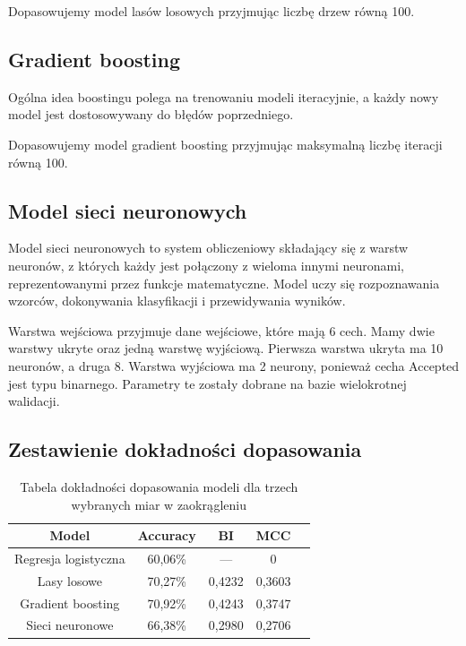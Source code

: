 \documentclass[12pt]{article}
\begin{document}
	\vspace{0.25cm}
	
	Dopasowujemy model lasów losowych przyjmując liczbę drzew równą 100.
	
	\subsection{Gradient boosting}\label{subsec:gradient-boosting}
	Ogólna idea boostingu polega na trenowaniu modeli iteracyjnie, a każdy nowy model jest dostosowywany do błędów poprzedniego.
	
	\vspace{0.25cm}
	
	Dopasowujemy model gradient boosting przyjmując maksymalną liczbę iteracji równą 100.
	
	\subsection{Model sieci neuronowych}\label{subsec:model-sieci-neuronowych}
	Model sieci neuronowych to system obliczeniowy składający się z warstw neuronów, z których każdy jest połączony z wieloma innymi neuronami, reprezentowanymi przez funkcje matematyczne. Model uczy się rozpoznawania wzorców, dokonywania klasyfikacji i przewidywania wyników.
	
	\vspace{0.25cm}
	
	Warstwa wejściowa przyjmuje dane wejściowe, które mają 6 cech. Mamy dwie warstwy ukryte oraz jedną warstwę wyjściową. Pierwsza warstwa ukryta ma 10 neuronów, a druga 8. Warstwa wyjściowa ma 2 neurony, ponieważ cecha Accepted jest typu binarnego. Parametry te zostały dobrane na bazie wielokrotnej walidacji.
	
	\subsection{Zestawienie dokładności dopasowania}\label{subsec:zestawienie-dopasowania-modeli}
	
	\begin{table}[H]
		\centering
		\begin{tabular}{c|cccc}
			\hline\hline
			       Model         & Accuracy &   BI   &  MCC   &  \\\hline
			Regresja logistyczna & 60,06\% &   ---  &   0    &  \\
			    Lasy losowe      & 70,27\% & 0,4232 & 0,3603 &  \\
			 Gradient boosting   & 70,92\% & 0,4243 & 0,3747 &  \\
			  Sieci neuronowe    & 66,38\% & 0,2980 & 0,2706 &  \\\hline
		\end{tabular}
		\caption{Tabela dokładności dopasowania modeli dla trzech wybranych miar w zaokrągleniu}
		\label{tab:dokladnosc}
	\end{table}
	
\end{document}

